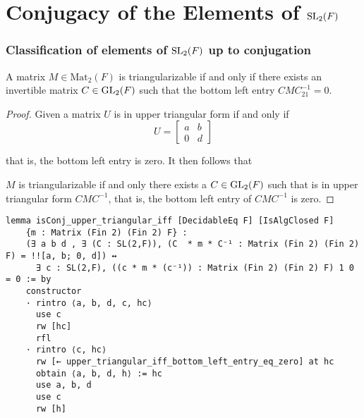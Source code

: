 \section{Conjugacy of the Elements of $\operatorname{SL}_2(F)$}

\subsubsection{Classification of elements of $\operatorname{SL}_2(F)$ up to conjugation}

\begin{lemma}
\label{isConj_upper_triangular_iff}
\leanok
    A matrix $M \in \textrm{Mat}_2(F)$ is triangularizable if and only if there exists an invertible matrix $C \in \operatorname{GL}_2(F)$ such that the bottom left entry
    $C M C^{-1}_{21} = 0$.
\end{lemma}

\begin{proof}
\leanok
    Given a matrix $U$ is in upper triangular form if and only if
    \[
    U = \begin{bmatrix}
    a & b\\
    0 & d
    \end{bmatrix}
    \]
    
    that is, the bottom left entry is zero. It then follows that 

    $M$ is triangularizable if and only there exists a $C \in \operatorname{GL}_2(F)$ such that is in upper triangular form $C M C^{-1}$, that is, the bottom left entry of $C M C^{-1}$ is zero. 
\end{proof}
\begin{footnotesize}
\begin{verbatim}
lemma isConj_upper_triangular_iff [DecidableEq F] [IsAlgClosed F]
    {m : Matrix (Fin 2) (Fin 2) F} :
    (∃ a b d , ∃ (C : SL(2,F)), (C  * m * C⁻¹ : Matrix (Fin 2) (Fin 2) F) = !![a, b; 0, d]) ↔
      ∃ c : SL(2,F), ((c * m * (c⁻¹)) : Matrix (Fin 2) (Fin 2) F) 1 0 = 0 := by
    constructor
    · rintro ⟨a, b, d, c, hc⟩
      use c
      rw [hc]
      rfl
    · rintro ⟨c, hc⟩
      rw [← upper_triangular_iff_bottom_left_entry_eq_zero] at hc
      obtain ⟨a, b, d, h⟩ := hc
      use a, b, d
      use c
      rw [h]
\end{verbatim}
\end{footnotesize}

